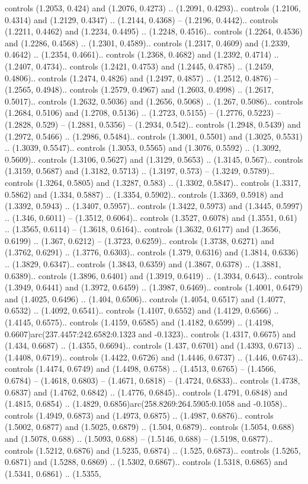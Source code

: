 controls (1.2053, 0.424) and (1.2076, 0.4273) .. (1.2091, 0.4293).. controls (1.2106, 0.4314) and (1.2129, 0.4347) .. (1.2144, 0.4368) -- (1.2196, 0.4442).. controls (1.2211, 0.4462) and (1.2234, 0.4495) .. (1.2248, 0.4516).. controls (1.2264, 0.4536) and (1.2286, 0.4568) .. (1.2301, 0.4589).. controls (1.2317, 0.4609) and (1.2339, 0.4642) .. (1.2354, 0.4661).. controls (1.2368, 0.4682) and (1.2392, 0.4714) .. (1.2407, 0.4734).. controls (1.2421, 0.4753) and (1.2445, 0.4785) .. (1.2459, 0.4806).. controls (1.2474, 0.4826) and (1.2497, 0.4857) .. (1.2512, 0.4876) -- (1.2565, 0.4948).. controls (1.2579, 0.4967) and (1.2603, 0.4998) .. (1.2617, 0.5017).. controls (1.2632, 0.5036) and (1.2656, 0.5068) .. (1.267, 0.5086).. controls (1.2684, 0.5106) and (1.2708, 0.5136) .. (1.2723, 0.5155) -- (1.2776, 0.5223) -- (1.2828, 0.529) -- (1.2881, 0.5356) -- (1.2934, 0.542).. controls (1.2948, 0.5439) and (1.2972, 0.5466) .. (1.2986, 0.5484).. controls (1.3001, 0.5501) and (1.3025, 0.5531) .. (1.3039, 0.5547).. controls (1.3053, 0.5565) and (1.3076, 0.5592) .. (1.3092, 0.5609).. controls (1.3106, 0.5627) and (1.3129, 0.5653) .. (1.3145, 0.567).. controls (1.3159, 0.5687) and (1.3182, 0.5713) .. (1.3197, 0.573) -- (1.3249, 0.5789).. controls (1.3264, 0.5805) and (1.3287, 0.583) .. (1.3302, 0.5847).. controls (1.3317, 0.5862) and (1.334, 0.5887) .. (1.3354, 0.5902).. controls (1.3369, 0.5918) and (1.3392, 0.5943) .. (1.3407, 0.5957).. controls (1.3422, 0.5973) and (1.3445, 0.5997) .. (1.346, 0.6011) -- (1.3512, 0.6064).. controls (1.3527, 0.6078) and (1.3551, 0.61) .. (1.3565, 0.6114) -- (1.3618, 0.6164).. controls (1.3632, 0.6177) and (1.3656, 0.6199) .. (1.367, 0.6212) -- (1.3723, 0.6259).. controls (1.3738, 0.6271) and (1.3762, 0.6291) .. (1.3776, 0.6303).. controls (1.379, 0.6316) and (1.3814, 0.6336) .. (1.3829, 0.6347).. controls (1.3843, 0.6359) and (1.3867, 0.6378) .. (1.3881, 0.6389).. controls (1.3896, 0.6401) and (1.3919, 0.6419) .. (1.3934, 0.643).. controls (1.3949, 0.6441) and (1.3972, 0.6459) .. (1.3987, 0.6469).. controls (1.4001, 0.6479) and (1.4025, 0.6496) .. (1.404, 0.6506).. controls (1.4054, 0.6517) and (1.4077, 0.6532) .. (1.4092, 0.6541).. controls (1.4107, 0.6552) and (1.4129, 0.6566) .. (1.4145, 0.6575).. controls (1.4159, 0.6585) and (1.4182, 0.6599) .. (1.4198, 0.6607)arc(237.4457:242.6582:0.1323 and -0.1323).. controls (1.4317, 0.6675) and (1.434, 0.6687) .. (1.4355, 0.6694).. controls (1.437, 0.6701) and (1.4393, 0.6713) .. (1.4408, 0.6719).. controls (1.4422, 0.6726) and (1.4446, 0.6737) .. (1.446, 0.6743).. controls (1.4474, 0.6749) and (1.4498, 0.6758) .. (1.4513, 0.6765) -- (1.4566, 0.6784) -- (1.4618, 0.6803) -- (1.4671, 0.6818) -- (1.4724, 0.6833).. controls (1.4738, 0.6837) and (1.4762, 0.6842) .. (1.4776, 0.6845).. controls (1.4791, 0.6848) and (1.4815, 0.6854) .. (1.4829, 0.6856)arc(258.8269:264.5905:0.1058 and -0.1058).. controls (1.4949, 0.6873) and (1.4973, 0.6875) .. (1.4987, 0.6876).. controls (1.5002, 0.6877) and (1.5025, 0.6879) .. (1.504, 0.6879).. controls (1.5054, 0.688) and (1.5078, 0.688) .. (1.5093, 0.688) -- (1.5146, 0.688) -- (1.5198, 0.6877).. controls (1.5212, 0.6876) and (1.5235, 0.6874) .. (1.525, 0.6873).. controls (1.5265, 0.6871) and (1.5288, 0.6869) .. (1.5302, 0.6867).. controls (1.5318, 0.6865) and (1.5341, 0.6861) .. (1.5355, 